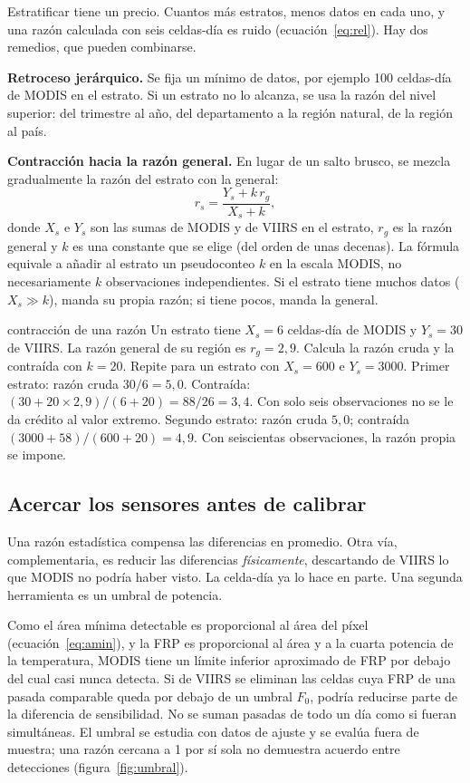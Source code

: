 Estratificar tiene un precio. Cuantos más estratos, menos datos en cada uno, y una razón
calculada con seis celdas-día es ruido (ecuación~\eqref{eq:rel}). Hay dos remedios, que pueden
combinarse.

\textbf{Retroceso jerárquico.} Se fija un mínimo de datos, por ejemplo 100 celdas-día de MODIS
en el estrato. Si un estrato no lo alcanza, se usa la razón del nivel superior: del trimestre al
año, del departamento a la región natural, de la región al país.

\textbf{Contracción hacia la razón general.} En lugar de un salto brusco, se mezcla
gradualmente la razón del estrato con la general:
\begin{equation}\label{eq:contraccion}
  r_s = \frac{Y_s + k\,r_g}{X_s + k},
\end{equation}
donde $X_s$ e $Y_s$ son las sumas de MODIS y de VIIRS en el estrato, $r_g$ es la razón general y
$k$ es una constante que se elige (del orden de unas decenas). La fórmula equivale a añadir al
estrato un pseudoconteo $k$ en la escala MODIS, no necesariamente $k$ observaciones
independientes. Si el estrato
tiene muchos datos ($X_s \gg k$), manda su propia razón; si tiene pocos, manda la general.

\begin{ejemplo}{contracción de una razón}
Un estrato tiene $X_s = 6$ celdas-día de MODIS y $Y_s = 30$ de VIIRS. La razón general de su
región es $r_g = 2{,}9$. Calcula la razón cruda y la contraída con $k = 20$. Repite para un
estrato con $X_s = 600$ e $Y_s = 3000$.
\solucion Primer estrato: razón cruda $30/6 = 5{,}0$. Contraída: $(30 + 20\times2{,}9)/(6+20) =
88/26 = 3{,}4$. Con solo seis observaciones no se le da crédito al valor extremo. Segundo
estrato: razón cruda $5{,}0$; contraída $(3000 + 58)/(600+20) = 4{,}9$. Con seiscientas
observaciones, la razón propia se impone.
\end{ejemplo}

\subsection{Acercar los sensores antes de calibrar}

Una razón estadística compensa las diferencias en promedio. Otra vía, complementaria, es reducir
las diferencias \emph{físicamente}, descartando de VIIRS lo que MODIS no podría haber visto. La
celda-día ya lo hace en parte. Una segunda herramienta es un umbral de potencia.

Como el área mínima detectable es proporcional al área del píxel (ecuación~\eqref{eq:amin}), y
la FRP es proporcional al área y a la cuarta potencia de la temperatura, MODIS tiene un límite
inferior aproximado de FRP por debajo del cual casi nunca detecta. Si de VIIRS se eliminan las
celdas cuya FRP de una pasada comparable queda por debajo de un umbral $F_0$, podría
reducirse parte de la diferencia de sensibilidad. No se suman pasadas de todo un día
como si fueran simultáneas. El umbral se estudia con datos de ajuste y se evalúa fuera
de muestra; una razón cercana a 1 por sí sola no demuestra acuerdo entre detecciones
(figura~\ref{fig:umbral}).

